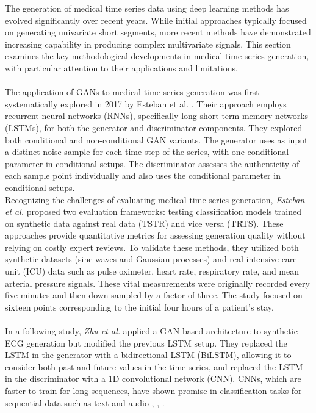 The generation of medical time series data using deep learning methods has evolved significantly over recent years. While initial approaches typically focused on generating univariate short segments, more recent methods have demonstrated increasing capability in producing complex multivariate signals. This section examines the key methodological developments in medical time series generation, with particular attention to their applications and limitations.
\\ \\
The application of GANs to medical time series generation was first systematically explored in 2017 by Esteban et al. \cite{estebanRealvaluedMedicalTime2017}. Their approach employs recurrent neural networks (RNNs), specifically long short-term memory networks (LSTMs), for both the generator and discriminator components.
They explored both conditional and non-conditional GAN variants. The generator uses as input a distinct noise sample for each time step of the series, with one conditional parameter in conditional setups. The discriminator assesses the authenticity of each sample point individually and also uses the conditional parameter in conditional setups.
\\
Recognizing the challenges of evaluating medical time series generation, \textit{Esteban et al.} proposed two evaluation frameworks: testing classification models trained on synthetic data against real data (TSTR) and vice versa (TRTS). These approaches provide quantitative metrics for assessing generation quality without relying on costly expert reviews.
To validate these methods, they utilized both synthetic datasets (sine waves and Gaussian processes) and real intensive care unit (ICU) data such as pulse oximeter, heart rate, respiratory rate, and mean arterial pressure signals. These vital measurements were originally recorded every five minutes and then down-sampled by a factor of three. The study focused on sixteen points corresponding to the initial four hours of a patient's stay. 
\\ \\
In a following study, \textit{Zhu et al.} \cite{zhuElectrocardiogramGenerationBidirectional2019} applied a GAN-based architecture to synthetic ECG generation but modified the previous LSTM setup. They replaced the LSTM in the generator with a bidirectional LSTM (BiLSTM), allowing it to consider both past and future values in the time series, and replaced the LSTM in the discriminator with a 1D convolutional network (CNN). CNNs, which are faster to train for long sequences, have shown promise in classification tasks for sequential data such as text and audio \cite{lecunConvolutionalNetworksImages1995}, \cite{kimConvolutionalNeuralNetworks2014}, \cite{zhangCharacterlevelConvolutionalNetworks2016}. 
